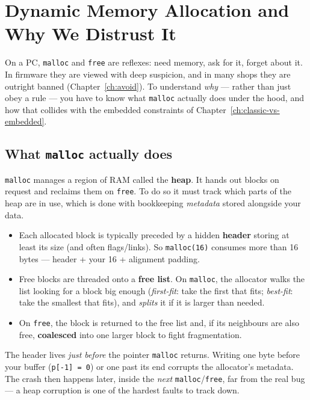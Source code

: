 \documentclass[11pt,a4paper,oneside]{book}
\newcommand{\code}[1]{\texttt{#1}}
\begin{document}
\chapter{Dynamic Memory Allocation and Why We Distrust It}
\label{ch:dynmem}

On a PC, \code{malloc} and \code{free} are reflexes: need memory, ask for it,
forget about it. In firmware they are viewed with deep suspicion, and in many
shops they are outright banned (Chapter~\ref{ch:avoid}). To understand
\emph{why} --- rather than just obey a rule --- you have to know what
\code{malloc} actually does under the hood, and how that collides with the
embedded constraints of Chapter~\ref{ch:classic-vs-embedded}.

\section{What \texttt{malloc} actually does}
\code{malloc} manages a region of RAM called the \textbf{heap}. It hands out
blocks on request and reclaims them on \code{free}. To do so it must track which
parts of the heap are in use, which is done with bookkeeping \emph{metadata}
stored alongside your data.

\begin{itemize}[leftmargin=1.4cm]
  \item Each allocated block is typically preceded by a hidden \textbf{header}
        storing at least its size (and often flags/links). So \code{malloc(16)}
        consumes more than 16 bytes --- header + your 16 + alignment padding.
  \item Free blocks are threaded onto a \textbf{free list}. On \code{malloc},
        the allocator walks the list looking for a block big enough
        (\emph{first-fit}: take the first that fits; \emph{best-fit}: take the
        smallest that fits), and \emph{splits} it if it is larger than needed.
  \item On \code{free}, the block is returned to the free list and, if its
        neighbours are also free, \textbf{coalesced} into one larger block to
        fight fragmentation.
\end{itemize}

\begin{warning}
The header lives \emph{just before} the pointer \code{malloc} returns. Writing
one byte before your buffer (\code{p[-1] = 0}) or one past its end corrupts the
allocator's metadata. The crash then happens later, inside the \emph{next}
\code{malloc}/\code{free}, far from the real bug --- a heap corruption is one of
the hardest faults to track down.
\end{warning}
\end{document}
